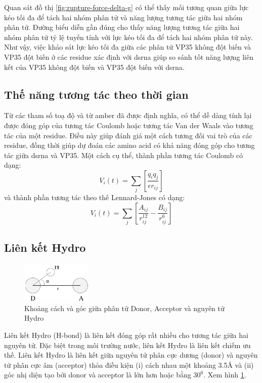 \documentclass[12pt,a4paper,reqno, oneside]{book}
\begin{document}
	Quan sát đồ thị \ref{fig:rupture-force-delta-g} có thể thấy mối tương quan giữa lực kéo tối đa để tách hai nhóm phân tử và năng lượng tương tác giữa hai nhóm phân tử. Đường biểu diễn gần đúng cho thấy năng lượng tương tác giữa hai nhóm phân tử tỷ lệ tuyến tính với lực kéo tối đa để tách hai nhóm phân tử này. Như vậy, việc khảo sát lực kéo tối đa giữa các phân tử VP35 không đột biến và VP35 đột biến ở các \gls{residue} xác định với \gls{dsrna} giúp so sánh tốt năng lượng liên kết của VP35 không đột biến và VP35 đột biến với \gls{dsrna}.
	\subsection{Thế năng tương tác theo thời gian}
	
	Từ các tham số toạ độ và từ \gls{amber} đã được định nghĩa, có thể dễ dàng tính lại được đóng góp của tương tác Coulomb hoặc tương tác Van der Waals vào tương tác của một \gls{residue}. Điều này giúp đánh giá một cách tương đối vai trò của các \gls{residue}, đồng thời giúp dự đoán các amino acid có khả năng đóng góp cho tương tác giữa \gls{dsrna} và VP35.
	Một cách cụ thể, thành phần tương tác Coulomb có dạng:
	\begin{equation}
	V_{i}\left(t\right) = \sum_{j}\left[\dfrac{q_{i} q_{j}}{\epsilon r_{ij}}\right]
	\end{equation}
	và thành phần tương tác theo thế Lennard-Jones có dạng:
	\begin{equation}
	V_{i}\left(t\right) = \sum_{j}\left[\dfrac{A_{ij}}{r_{ij}^{12}}-\dfrac{B_{ij}}{r_{ij}^{6}}\right]
	\end{equation}
	\subsection{Liên kết Hydro}
	\begin{figure}[h]
	\centering
	\includegraphics[width=0.3\textwidth,natwidth=610,natheight=642]{hbond}
	\caption{Khoảng cách và góc giữa phân tử Donor, Acceptor và nguyên tử Hydro}
	\label{fig:hbond_angle}
	\end{figure}
	Liên kết Hydro (H-bond) là liên kết đóng góp rất nhiều cho tương tác giữa hai nguyên tử. Đặc biệt trong môi trường nước, liên kết Hydro là liên kết chiếm ưu thế.
	Liên kết Hydro là liên kết giữa nguyên tử phân cực dương (donor) và nguyên tử phân cực âm (acceptor) thỏa điều kiện (i) cách nhau một khoảng 3.5\AA{} và (ii) góc nhị diện tạo bởi donor và acceptor là lớn hơn hoặc bằng $ 30^{0} $. Xem hình \ref{fig:hbond_angle}.
\end{document}
